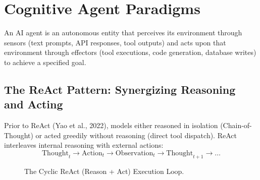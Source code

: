 \section{Cognitive Agent Paradigms}

An AI agent is an autonomous entity that perceives its environment through sensors (text prompts, API responses, tool outputs) and acts upon that environment through effectors (tool executions, code generation, database writes) to achieve a specified goal.

\subsection{The ReAct Pattern: Synergizing Reasoning and Acting}
Prior to ReAct (Yao et al., 2022), models either reasoned in isolation (Chain-of-Thought) or acted greedily without reasoning (direct tool dispatch). 
ReAct interleaves internal reasoning with external actions:
\begin{equation}
\text{Thought}_t \longrightarrow \text{Action}_t \longrightarrow \text{Observation}_t \longrightarrow \text{Thought}_{t+1} \longrightarrow \dots
\end{equation}

\begin{figure}[htbp]
\centering
{}
\caption{The Cyclic ReAct (Reason + Act) Execution Loop.}
\label{fig:react_loop}
\end{figure}

